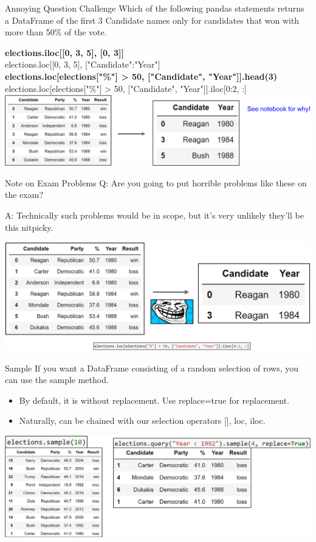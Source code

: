 \documentclass[aspectratio=169]{../latex_main/tntbeamer}  %
\begin{document}
	\begin{frame}{Annoying Question Challenge }
	   Which of the following pandas statements returns a DataFrame of the first 3 Candidate names only for candidates that won with more than 50\% of the vote.
	   
	   \textbf{elections.iloc[[0, 3, 5], [0, 3]]}\\
       elections.loc[[0, 3, 5], ["Candidate":"Year"]\\
       \textbf{elections.loc[elections["\%"] > 50, ["Candidate", "Year"]].head(3)}\\
       elections.loc[elections["\%"] > 50, ["Candidate", "Year"]].iloc[0:2, :]\\

	    \includegraphics[scale=.4]{Bild34}
	\end{frame}
	
	
	\begin{frame}{Note on Exam Problems}
	   Q: Are you going to put horrible problems like these on the exam?
	   
	   A: Technically such problems would be in scope, but it’s very unlikely they’ll be this nitpicky.

	    \includegraphics[scale=.5]{Bild35}
	\end{frame}
	
	
	\begin{frame}{Sample}
	   If you want a DataFrame consisting of a random selection of rows, you can use the sample method.
	   \begin{itemize}
	       \item By default, it is without replacement. Use replace=true for replacement.
	       \item Naturally, can be chained with our selection operators [], loc, iloc.
	   \end{itemize}
	    \includegraphics[scale=.4]{Bild36}
	\end{frame}
	
\end{document}
